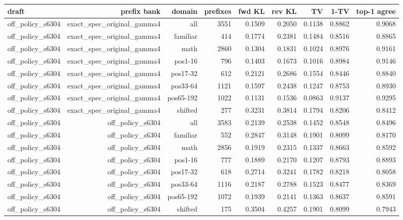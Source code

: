 \begin{tabular}{lrrrrrrrr}
\toprule
draft & prefix bank & domain & prefixes & fwd KL & rev KL & TV & 1-TV & top-1 agree \\
\midrule
off\_policy\_s6304 & exact\_spec\_original\_gamma4 & all & 3551 & 0.1509 & 0.2050 & 0.1138 & 0.8862 & 0.9068 \\
off\_policy\_s6304 & exact\_spec\_original\_gamma4 & familiar & 414 & 0.1774 & 0.2381 & 0.1484 & 0.8516 & 0.8865 \\
off\_policy\_s6304 & exact\_spec\_original\_gamma4 & math & 2860 & 0.1304 & 0.1831 & 0.1024 & 0.8976 & 0.9161 \\
off\_policy\_s6304 & exact\_spec\_original\_gamma4 & pos1-16 & 796 & 0.1403 & 0.1673 & 0.1016 & 0.8984 & 0.9146 \\
off\_policy\_s6304 & exact\_spec\_original\_gamma4 & pos17-32 & 612 & 0.2121 & 0.2686 & 0.1554 & 0.8446 & 0.8840 \\
off\_policy\_s6304 & exact\_spec\_original\_gamma4 & pos33-64 & 1121 & 0.1597 & 0.2438 & 0.1247 & 0.8753 & 0.8930 \\
off\_policy\_s6304 & exact\_spec\_original\_gamma4 & pos65-192 & 1022 & 0.1131 & 0.1536 & 0.0863 & 0.9137 & 0.9295 \\
off\_policy\_s6304 & exact\_spec\_original\_gamma4 & shifted & 277 & 0.3231 & 0.3814 & 0.1794 & 0.8206 & 0.8412 \\
off\_policy\_s6304 & off\_policy\_s6304 & all & 3583 & 0.2139 & 0.2538 & 0.1452 & 0.8548 & 0.8496 \\
off\_policy\_s6304 & off\_policy\_s6304 & familiar & 552 & 0.2847 & 0.3148 & 0.1901 & 0.8099 & 0.8170 \\
off\_policy\_s6304 & off\_policy\_s6304 & math & 2856 & 0.1919 & 0.2315 & 0.1337 & 0.8663 & 0.8592 \\
off\_policy\_s6304 & off\_policy\_s6304 & pos1-16 & 777 & 0.1889 & 0.2170 & 0.1207 & 0.8793 & 0.8893 \\
off\_policy\_s6304 & off\_policy\_s6304 & pos17-32 & 618 & 0.2714 & 0.3241 & 0.1782 & 0.8218 & 0.8058 \\
off\_policy\_s6304 & off\_policy\_s6304 & pos33-64 & 1116 & 0.2187 & 0.2788 & 0.1523 & 0.8477 & 0.8369 \\
off\_policy\_s6304 & off\_policy\_s6304 & pos65-192 & 1072 & 0.1939 & 0.2141 & 0.1363 & 0.8637 & 0.8591 \\
off\_policy\_s6304 & off\_policy\_s6304 & shifted & 175 & 0.3504 & 0.4257 & 0.1901 & 0.8099 & 0.7943 \\

\end{tabular}
